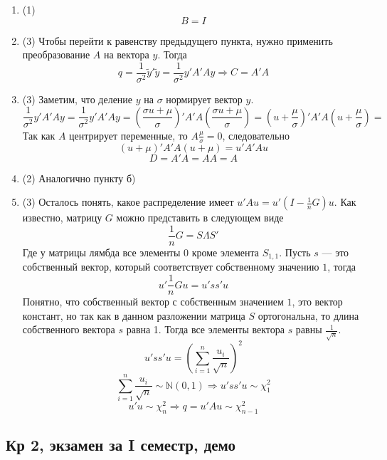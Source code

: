 \documentclass[12pt, a4paper]{article}
\theoremstyle{definition}
\begin{document}
\begin{enumerate}
\begin{enumerate}
\item (1)
\[
B = I
\]
\item (3)
Чтобы перейти к равенству предыдущего пункта, нужно применить преобразование $A$ на вектора $y$. Тогда
\[
q = \frac{1}{\sigma^2}\tilde{y}' \tilde{y} =  \frac{1}{\sigma^2}y'A' A y \Rightarrow C = A' A
\]
\item (3)
Заметим, что деление $y$ на $\sigma$ нормирует вектор $y$.
\[
\frac{1}{\sigma^2}y'A' A y = \frac{1}{\sigma^2}y'A' A y = \left( \frac{\sigma u + \mu}{\sigma} \right)' A' A \left( \frac{\sigma u + \mu}{\sigma} \right) = (u + \frac{\mu}{\sigma})'A' A(u + \frac{\mu}{\sigma}) =
\]
Так как $A$ центрирует переменные, то $A\frac{\mu}{\sigma} = 0$, следовательно
\[
 (u + \mu)'A' A(u + \mu) = u'A'Au
\]
\[
D = A'A = AA = A
\]
\item (2)
Аналогично пункту б)
\item (3)
Осталось понять, какое распределение имеет $u'Au = u'(I - \frac{1}{n}G)u$. Как известно, матрицу $G$ можно представить в следующем виде
\[
\frac{1}{n}G = S\Lambda S'
\]
Где у матрицы лямбда все элементы 0 кроме элемента $S_{1,1}$. Пусть $s$ — это собственный вектор, который соответствует собственному значению $1$, тогда
\[
u'\frac{1}{n}Gu = u'ss'u
\]
Понятно, что собственный вектор с собственным значением $1$, это вектор констант, но так как в данном разложении матрица $S$ ортогональна, то длина собственного вектора $s$ равна 1. Тогда все элементы вектора $s$ равны $\frac{1}{\sqrt{n}}$.
\[
 u'ss'u = \left( \sum_{i = 1}^n \frac{u_i}{\sqrt{n}} \right)^2
\]
\[
\sum_{i = 1}^n \frac{u_i}{\sqrt{n}} \sim \mathbb{N} (0,1) \Rightarrow  u'ss'u \sim \chi_{1}^2
\]
\[
u'u \sim \chi_{n}^2 \Rightarrow q = u'Au \sim \chi_{n-1}^2
\]
\end{enumerate}
\end{enumerate}


\subsection{Кр 2, экзамен за I семестр, демо}





\end{document}
